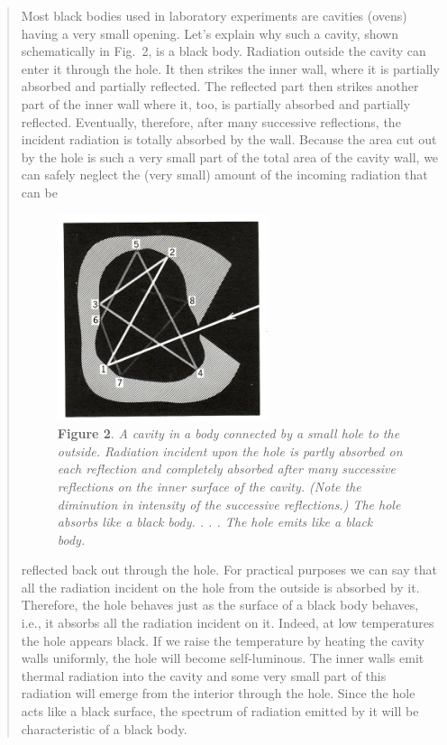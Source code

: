 \begin{quotation}
Most black bodies used in laboratory experiments are cavities (ovens)
having a very small opening. Let's explain why such a cavity, shown
schematically in Fig.\ 2, is a black body. Radiation outside the cavity
can enter it through the hole. It then strikes the inner wall, where it
is partially absorbed and partially reflected. The reflected part then
strikes another part of the inner wall where it, too, is partially
absorbed and partially reflected. Eventually, therefore, after many
successive reflections, the incident radiation is totally absorbed by
the wall. Because the area cut out by the hole is such a very small part
of the total area of the cavity wall, we can safely neglect the (very
small) amount of the incoming radiation that can be
%
\begin{figure}[h]
  \begin{center}
  \captionsetup{width=.75\textwidth}
  \includegraphics[width=2.4375in,height=2.38542in]{images/05_planck/image007.jpg}
  \caption*{\textbf{Figure 2}. \emph{A cavity in a body connected by a small hole to the
    outside. Radiation incident upon the hole is partly absorbed on each
    reflection and completely absorbed after many successive reflections on
    the inner surface of the cavity. (Note the diminution in intensity of
    the successive reflections.) The hole absorbs like a black body. . . .
    The hole emits like a black body.}}
  \end{center}
\end{figure}
%
reflected back out through the hole. For practical purposes we can say
that all the radiation incident on the hole from the outside is absorbed
by it. Therefore, the hole behaves just as the surface of a black body
behaves, i.e., it absorbs all the radiation incident on it. Indeed, at
low temperatures the hole appears black. If we raise the temperature by
heating the cavity walls uniformly, the hole will become self-luminous.
The inner walls emit thermal radiation into the cavity and some very
small part of this radiation will emerge from the interior through the
hole. Since the hole acts like a black surface, the spectrum of
radiation emitted by it will be characteristic of a black body.


\end{quotation}
